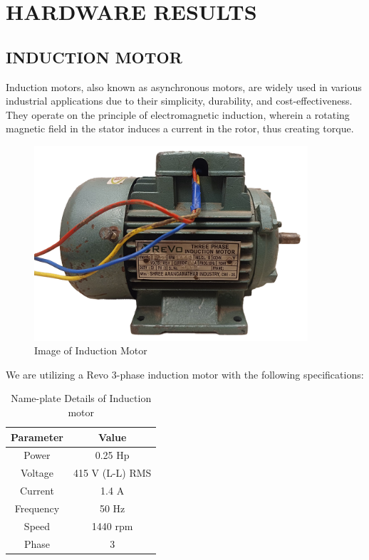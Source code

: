 \section{HARDWARE RESULTS}


\subsection{INDUCTION MOTOR}

Induction motors, also known as asynchronous motors, are widely used in various industrial applications due to their simplicity, durability, and cost-effectiveness. They operate on the principle of electromagnetic induction, wherein a rotating magnetic field in the stator induces a current in the rotor, thus creating torque.

\begin{figure}[H]
	\centering
	\includegraphics[width=4.0in]{sections/section4/images/inductionMotor/revo.png}
	\caption{Image of Induction Motor}
\end{figure}

We are utilizing a Revo 3-phase induction motor with the following specifications:

\begin{table}[H]
	\centering
	\begin{tabular}{|c|c|}
		\hline
		\textbf{Parameter} & \textbf{Value} \\ \hline
		Power & 0.25 Hp \\ \hline
		Voltage & 415 V (L-L) RMS \\ \hline
		Current & 1.4 A \\ \hline
		Frequency & 50 Hz \\ \hline
		Speed & 1440 rpm \\ \hline
		Phase & 3 \\ \hline
	\end{tabular}
	\caption{Name-plate Details of Induction motor}
\end{table}



